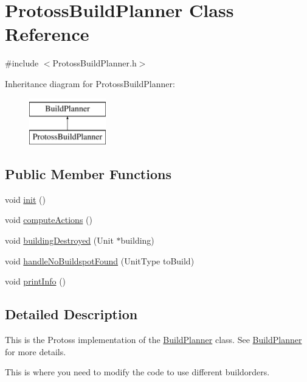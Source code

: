 \hypertarget{class_protoss_build_planner}{
\section{ProtossBuildPlanner Class Reference}
\label{class_protoss_build_planner}
}


{\ttfamily \#include $<$ProtossBuildPlanner.h$>$}

Inheritance diagram for ProtossBuildPlanner:\begin{figure}[H]
\begin{center}
\leavevmode
\includegraphics[height=2.000000cm]{class_protoss_build_planner}
\end{center}
\end{figure}
\subsection*{Public Member Functions}
\begin{DoxyCompactItemize}
\item 
void \hyperlink{class_protoss_build_planner_a4862d3dafa7e8f55a9d3959e7f9f6861}{init} ()
\item 
void \hyperlink{class_protoss_build_planner_ac5792fb34192f3ec418812fd70b4ceed}{computeActions} ()
\item 
void \hyperlink{class_protoss_build_planner_a89987c0724dc05b1aaf353c5b6ca518d}{buildingDestroyed} (Unit $\ast$building)
\item 
void \hyperlink{class_protoss_build_planner_af97d0ee0524f97c4bdde06bc02b5d6ef}{handleNoBuildspotFound} (UnitType toBuild)
\item 
void \hyperlink{class_protoss_build_planner_a966ba32be3d24f93476e42861fbf79fa}{printInfo} ()
\end{DoxyCompactItemize}


\subsection{Detailed Description}
This is the Protoss implementation of the \hyperlink{class_build_planner}{BuildPlanner} class. See \hyperlink{class_build_planner}{BuildPlanner} for more details.

This is where you need to modify the code to use different buildorders.

